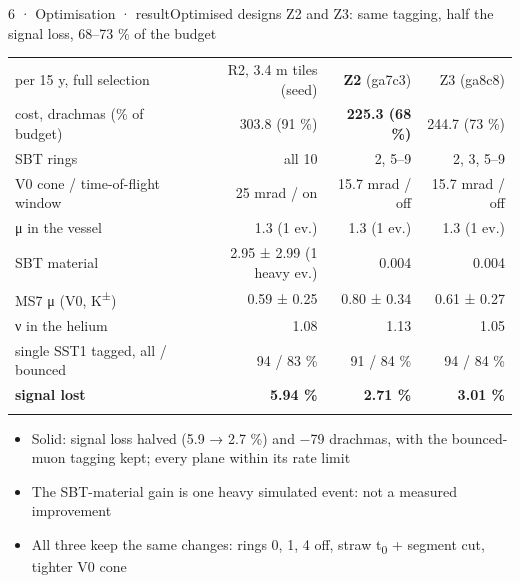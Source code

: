 \begin{btframe}{6 · Optimisation · result}{Optimised designs Z2 and Z3: same tagging, half the signal loss, 68–73 \% of the budget}
{\fontsize{5.31pt}{6.90pt}\selectfont\setlength{\tabcolsep}{3.72pt}\renewcommand{\arraystretch}{1.42}
\begin{tabularx}{\linewidth}{>{\raggedright\arraybackslash}Xrrr}
\textcolor{muted}{per 15 y, full selection} & \textcolor{muted}{R2, 3.4 m tiles (seed)} & \textcolor{muted}{\textbf{Z2} (ga7c3)} & \textcolor{muted}{Z3 (ga8c8)} \\\headrule
cost, drachmas (\% of budget) & 303.8 (91 \%) & \textbf{225.3 (68 \%)} & 244.7 (73 \%) \\\rowrule
SBT rings & all 10 & 2, 5–9 & 2, 3, 5–9 \\\rowrule
V0 cone / time-of-flight window & 25 mrad / on & 15.7 mrad / off & 15.7 mrad / off \\\rowrule
μ in the vessel & 1.3 (1 ev.) & 1.3 (1 ev.) & 1.3 (1 ev.) \\\rowrule
SBT material & 2.95 ± 2.99 (1 heavy ev.) & 0.004 & 0.004 \\\rowrule
MS7 μ (V0, K\textsuperscript{±}) & 0.59 ± 0.25 & 0.80 ± 0.34 & 0.61 ± 0.27 \\\rowrule
ν in the helium & 1.08 & 1.13 & 1.05 \\\rowrule
single SST1 tagged, all / bounced & 94 / 83 \% & 91 / 84 \% & 94 / 84 \% \\\rowrule
\rowcolor{tint}\bfseries signal lost & \bfseries 5.94 \% & \bfseries 2.71 \% & \bfseries 3.01 \% \\\rowrule
\end{tabularx}\par}
\vspace{2.46pt}
{\fontsize{6.15pt}{8.60pt}\selectfont
\begin{itemize}
  \item Solid: signal loss halved (5.9 → 2.7 \%) and −79 drachmas, with the bounced-muon tagging kept; every plane within its rate limit
  \item The SBT-material gain is one heavy simulated event: not a measured improvement
  \item All three keep the same changes: rings 0, 1, 4 off, straw t\textsubscript{0} + segment cut, tighter V0 cone
\end{itemize}}
\end{btframe}

